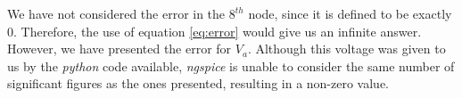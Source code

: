 We have not considered the error in the $8^{th}$ node, since it is defined to be exactly 0. Therefore, the use of equation \ref{eq:error} would give us an infinite answer. However, we have presented the error for $V_a$. Although this voltage was given to us by the \emph{python} code available, \emph{ngspice} is unable to consider the same number of significant figures as the ones presented, resulting in a non-zero value.
